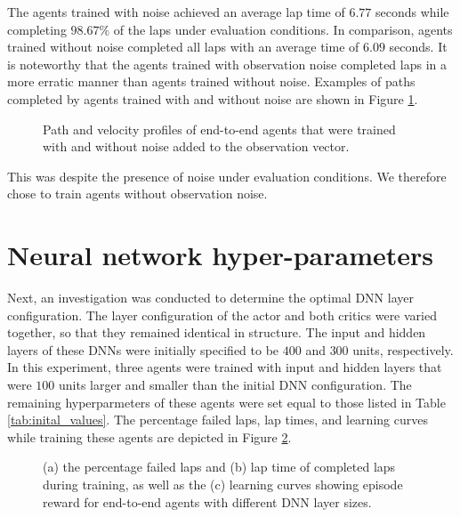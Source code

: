 The agents trained with noise achieved an average lap time of $6.77$ seconds while completing $98.67\%$ of the laps under evaluation conditions. 
In comparison, agents trained without noise completed all laps with an average time of $6.09$ seconds.
It is noteworthy that the agents trained with observation noise completed laps in a more erratic manner than agents trained without noise.
Examples of paths completed by agents trained with and without noise are shown in Figure \ref{fig:noise_lap}.
\begin{figure}[htb!]
    \centering
    
    \caption[Path and velocity profiles of end-to-end agents that were trained with and without noise added to the observation vector]{Path and velocity profiles of end-to-end agents that were trained with and without noise added to the observation vector.}
    \label{fig:noise_lap}
\end{figure}
This was despite the presence of noise under evaluation conditions.
We therefore chose to train agents without observation noise.




\section{Neural network hyper-parameters}

Next, an investigation was conducted to determine the optimal DNN layer configuration.
The layer configuration of the actor and both critics were varied together, so that they remained identical in structure.
The input and hidden layers of these DNNs were initially specified to be $400$ and $300$ units, respectively.
In this experiment, three agents were trained with input and hidden layers that were $100$ units larger and smaller than the initial DNN configuration.
The remaining hyperparmeters of these agents were set equal to those listed in Table \ref{tab:inital_values}.
The percentage failed laps, lap times, and learning curves while training these agents are depicted in Figure \ref{fig:layer_sizes}.

\begin{figure}[htb!]
    \centering
    
    \caption[Learning curves for tuning the target update rate]{(a) the percentage failed laps and (b) lap time of completed laps during training, as well as the (c) learning curves showing episode reward for end-to-end agents with different DNN layer sizes.}
    \label{fig:layer_sizes}
\end{figure}


